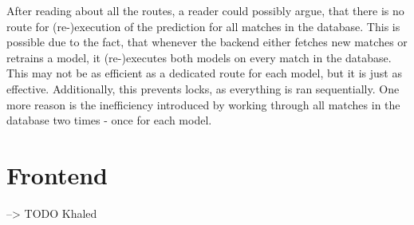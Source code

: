After reading about all the routes, a reader could possibly argue, that there is no route for (re-)execution of the prediction for all matches in the database. This is possible due to the fact, that whenever the backend either fetches new matches or retrains a model, it (re-)executes both models on every match in the database. This may not be as efficient as a dedicated route for each model, but it is just as effective. Additionally, this prevents locks, as everything is ran sequentially. One more reason is the inefficiency introduced by working through all matches in the database two times - once for each model.

\section{Frontend}
--> TODO Khaled
